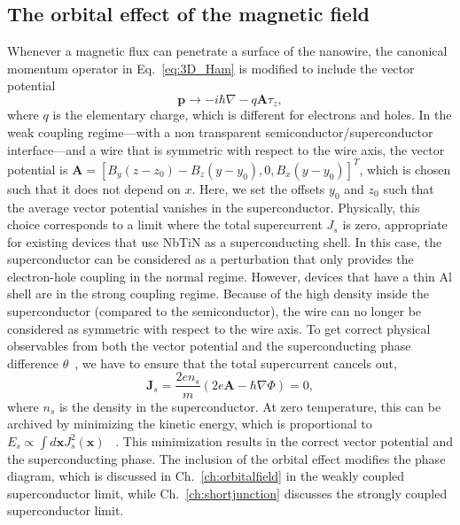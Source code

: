 \subsection{The orbital effect of the magnetic field}\label{sec:orbital_effect_of_magnetic_field}
Whenever a magnetic flux can penetrate a surface of the nanowire, the canonical momentum operator in Eq.~\eqref{eq:3D_Ham} is modified to include the vector potential
\begin{equation}
\bm{p} \rightarrow -i \hbar \nabla - q \bm{A} \tau_z,\label{eq:continuum_kinetic_with_orbital}
\end{equation}
where $q$ is the elementary charge, which is different for electrons and holes.
In the weak coupling regime---with a non transparent semiconductor/superconductor interface---and a wire that is symmetric with respect to the wire axis, the vector potential is $\mathbf{A}={\left[ B_y (z - z_0) - B_z (y - y_0), 0, B_x (y - y_0)\right]}^{T}$, which is chosen such that it does not depend on $x$.
Here, we set the offsets $y_0$ and $z_0$ such that the average vector potential vanishes in the superconductor.
Physically, this choice corresponds to a limit where the total supercurrent $J_s$ is zero, appropriate for existing devices that use NbTiN as a superconducting shell.
In this case, the superconductor can be considered as a perturbation that only provides the electron-hole coupling in the normal regime.
However, devices that have a thin Al shell are in the strong coupling regime.
Because of the high density inside the superconductor (compared to the semiconductor), the wire can no longer be considered as symmetric with respect to the wire axis.
To get correct physical observables from both the vector potential and the superconducting phase difference $\theta$~\cite{Wojcik2018}, we have to ensure that the total supercurrent cancels out,
\begin{equation}
\bm{J}_s = \frac{2e n_s}{m}\left(2e \bm{A} - \hbar \nabla \Phi \right)=0,
\end{equation}
where $n_s$ is the density in the superconductor.
At zero temperature, this can be archived by minimizing the kinetic energy, which is proportional to $E_s \propto \int d \bm{x} J_s^2(\bm{x})$ ~\cite{Winkler2019}.
This minimization results in the correct vector potential and the superconducting phase.
The inclusion of the orbital effect modifies the phase diagram, which is discussed in Ch.~\ref{ch:orbitalfield} in the weakly coupled superconductor limit, while Ch.~\ref{ch:shortjunction} discusses the strongly coupled superconductor limit.

